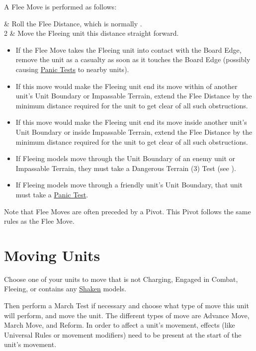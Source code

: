 A Flee Move is performed as follows:

 & Roll the Flee Distance, which is normally .\\
2 & Move the Fleeing unit this distance straight forward.\\
\closeseqtable

\begin{itemize}
\item If the Flee Move takes the Fleeing unit into contact with the Board Edge, remove the unit as a casualty as soon as it touches the Board Edge (possibly causing \hyperref[panic_test]{Panic Tests} to nearby units).
\item If this move would make the Fleeing unit end its move within  of another unit's Unit Boundary or Impassable Terrain, extend the Flee Distance by the minimum distance required for the unit to get clear of all such obstructions.
\item If this move would make the Fleeing unit end its move inside another unit's Unit Boundary or inside Impassable Terrain, extend the Flee Distance by the minimum distance required for the unit to get clear of all such obstructions.
\item If Fleeing models move through the Unit Boundary of an enemy unit or Impassable Terrain, they must take a Dangerous Terrain (3) Test (see ).
\item If Fleeing models move through a friendly unit's Unit Boundary, that unit must take a \hyperref[panic_test]{Panic Test}.
\end{itemize}

Note that Flee Moves are often preceded by a Pivot. This Pivot follows the same rules as the Flee Move.

\section{Moving Units}
\label{moving_units}

Choose one of your units to move that is not Charging, Engaged in Combat, Fleeing, or contains any \hyperref[shaken]{Shaken} models.

Then perform a March Test if necessary and choose what type of move this unit will perform, and move the unit. The different types of move are Advance Move, March Move, and Reform. In order to affect a unit's movement, effects (like Universal Rules or movement modifiers) need to be present at the start of the unit's movement.


